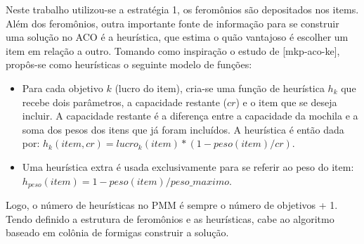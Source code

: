 Neste trabalho utilizou-se a estratégia 1, os feromônios são depositados nos items. Além dos feromônios, outra importante fonte de informação para se construir uma solução no ACO é a heurística, que estima o quão vantajoso é escolher um item em relação a outro. Tomando como inspiração o estudo de [mkp-aco-ke], propôs-se como heurísticas o seguinte modelo de funções:

\begin{itemize}
	\item Para cada objetivo $k$ (lucro do item), cria-se uma função de heurística $h_k$ que recebe dois parâmetros, a capacidade restante ($cr$) e o item que se deseja incluir. A capacidade restante é a diferença entre a capacidade da mochila e a soma dos pesos dos itens que já foram incluídos. A heurística é então dada por: $h_k(item, cr) = lucro_k(item) * (1 - peso(item) / cr)$.
	\item Uma heurística extra é usada exclusivamente para se referir ao peso do item: $h_{peso}(item) = 1 - peso(item) / peso\_maximo$.
\end{itemize}

Logo, o número de heurísticas no PMM é sempre o número de objetivos + 1. Tendo definido a estrutura de feromônios e as heurísticas, cabe ao algoritmo baseado em colônia de formigas construir a solução.